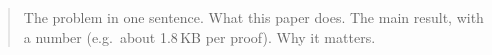 \begin{abstract}
The problem in one sentence. What this paper does. The main result, with a number
(e.g.\ about 1.8\,KB per proof). Why it matters.

\end{abstract}
